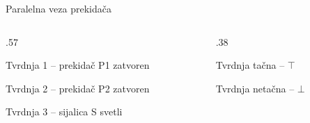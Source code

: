 \begin{frame}[label=01-s006]{Paralelna veza prekidača}
\begin{columns}[T,onlytextwidth]
\begin{column}{.57\textwidth}
{\centering\par}
\vspace{2mm}
{\fontsize{11}{13}\selectfont\setlength{\parskip}{0pt}
Tvrdnja 1 – prekidač P1 zatvoren\par
Tvrdnja 2 – prekidač P2 zatvoren\par
Tvrdnja 3 – sijalica S svetli\par}
\end{column}
\begin{column}{.38\textwidth}
{\centering\par}
\vspace{2mm}
{\centering\fontsize{11}{13}\selectfont\setlength{\parskip}{0pt}
Tvrdnja tačna – \(\top\)\par
Tvrdnja netačna – \(\bot\)\par}
\end{column}
\end{columns}
\vspace{2mm}
\end{frame}
